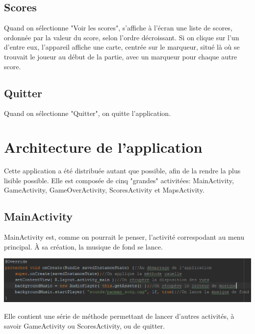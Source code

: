 \documentclass{article}
\begin{document}
\subsection{Scores}
\label{subsection:1_2}
Quand on sélectionne "Voir les scores", s'affiche à l'écran une liste de scores, ordonnée par la valeur du score, selon l'ordre décroissant.
Si on clique sur l'un d'entre eux, l'appareil affiche une carte, centrée sur le marqueur, situé là où se trouvait le joueur au début de la partie, avec un marqueur pour chaque autre score.

\subsection{Quitter}
\label{subsection:1_3}
Quand on sélectionne "Quitter", on quitte l'application.

\section{Architecture de l'application}
\label{section:architecture}
Cette application a été distribuée autant que possible, afin de la rendre la plus lisible possible.
Elle est composée de cinq "grandes" activitées: MainActivity, GameActivity, GameOverActivity, ScoresActivity et MapsActivity.

\subsection{MainActivity}
\label{subsection:2_1}
MainActivity est, comme on pourrait le penser, l'activité correspodant au menu principal.
\`A sa création, la musique de fond se lance.
\begin{center}
  \includegraphics[scale=0.5]{MainActivity_onCreate.png}
\end{center}
Elle contient une série de méthode permettant de lancer d'autres activités, à savoir GameActivity ou ScoresActivity, ou de quitter.
\end{document}
